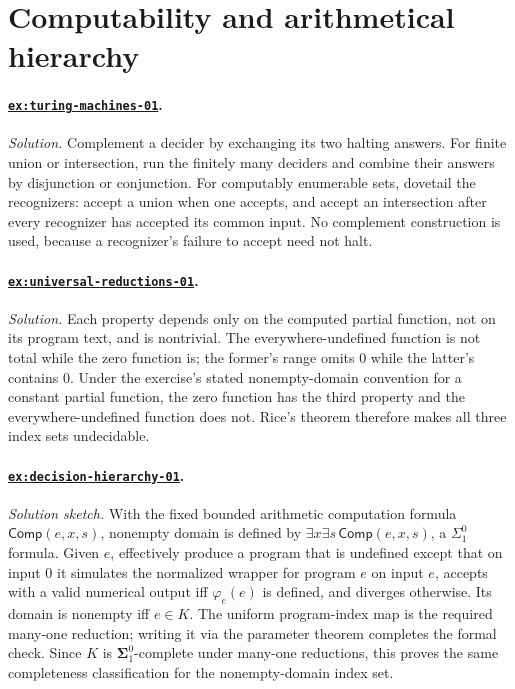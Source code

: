 \section{Computability and arithmetical hierarchy}

\paragraph{\hyperref[ex:turing-machines-01]{\texttt{ex:turing-machines-01}}.}
\textit{Solution.}  Complement a decider by exchanging its two halting answers.
For finite union or intersection, run the finitely many deciders and combine
their answers by disjunction or conjunction.  For computably enumerable sets,
dovetail the recognizers: accept a union when one accepts, and accept an
intersection after every recognizer has accepted its common input.  No
complement construction is used, because a recognizer's failure to accept need
not halt.

\paragraph{\hyperref[ex:universal-reductions-01]{\texttt{ex:universal-reductions-01}}.}
\textit{Solution.}  Each property depends only on the computed partial
function, not on its program text, and is nontrivial.  The everywhere-undefined
function is not total while the zero function is; the former's range omits
\(0\) while the latter's contains \(0\).  Under the exercise's stated
nonempty-domain convention for a constant partial function, the zero function
has the third property and the everywhere-undefined function does not.  Rice's
theorem therefore makes all three index sets undecidable.

\paragraph{\hyperref[ex:decision-hierarchy-01]{\texttt{ex:decision-hierarchy-01}}.}
\textit{Solution sketch.}  With the fixed bounded arithmetic computation
formula \(\mathsf{Comp}(e,x,s)\), nonempty domain is defined by
\(\exists x\exists s\,\mathsf{Comp}(e,x,s)\), a \(\Sigma^0_1\) formula.  Given \(e\),
effectively produce a program that is undefined except that on input \(0\) it
simulates the normalized wrapper for program \(e\) on input \(e\), accepts
with a valid numerical output iff \(\varphi_e(e)\) is defined, and diverges
otherwise.
Its domain is nonempty iff \(e\in K\).  The uniform program-index map
is the required many-one reduction; writing it via the parameter theorem
completes the formal check.  Since \(K\) is
\(\boldsymbol{\Sigma}^0_1\)-complete under many-one reductions, this proves
the same completeness classification for the nonempty-domain index set.

